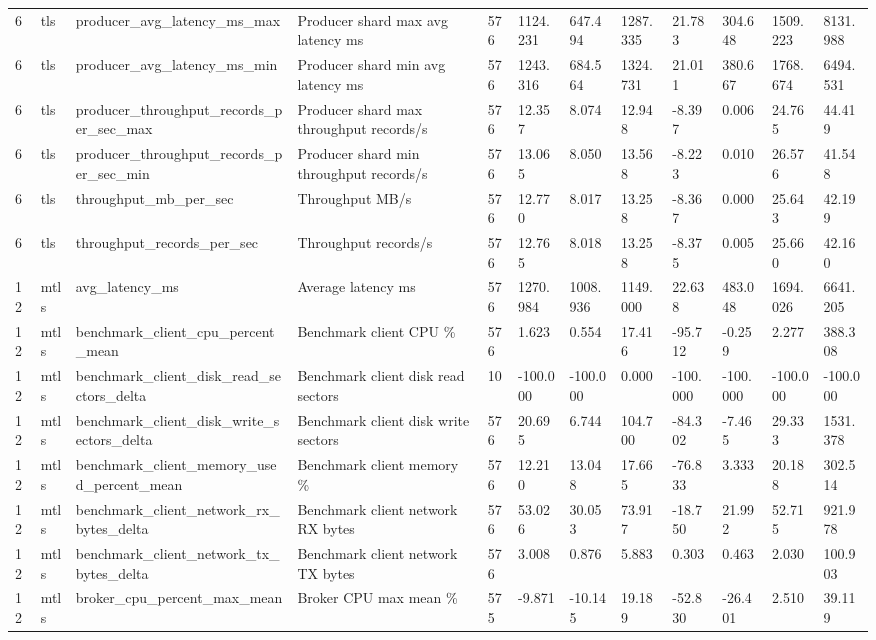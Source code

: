\begin{longtable}{llllllllllll}
6 & tls & producer\_avg\_latency\_ms\_max & Producer shard max avg latency ms & 576 & 1124.231 & 647.494 & 1287.335 & 21.783 & 304.648 & 1509.223 & 8131.988 \\
6 & tls & producer\_avg\_latency\_ms\_min & Producer shard min avg latency ms & 576 & 1243.316 & 684.564 & 1324.731 & 21.011 & 380.667 & 1768.674 & 6494.531 \\
6 & tls & producer\_throughput\_records\_per\_sec\_max & Producer shard max throughput records/s & 576 & 12.357 & 8.074 & 12.948 & -8.397 & 0.006 & 24.765 & 44.419 \\
6 & tls & producer\_throughput\_records\_per\_sec\_min & Producer shard min throughput records/s & 576 & 13.065 & 8.050 & 13.568 & -8.223 & 0.010 & 26.576 & 41.548 \\
6 & tls & throughput\_mb\_per\_sec & Throughput MB/s & 576 & 12.770 & 8.017 & 13.258 & -8.367 & 0.000 & 25.643 & 42.199 \\
6 & tls & throughput\_records\_per\_sec & Throughput records/s & 576 & 12.765 & 8.018 & 13.258 & -8.375 & 0.005 & 25.660 & 42.160 \\
12 & mtls & avg\_latency\_ms & Average latency ms & 576 & 1270.984 & 1008.936 & 1149.000 & 22.638 & 483.048 & 1694.026 & 6641.205 \\
12 & mtls & benchmark\_client\_cpu\_percent\_mean & Benchmark client CPU \% & 576 & 1.623 & 0.554 & 17.416 & -95.712 & -0.259 & 2.277 & 388.308 \\
12 & mtls & benchmark\_client\_disk\_read\_sectors\_delta & Benchmark client disk read sectors & 10 & -100.000 & -100.000 & 0.000 & -100.000 & -100.000 & -100.000 & -100.000 \\
12 & mtls & benchmark\_client\_disk\_write\_sectors\_delta & Benchmark client disk write sectors & 576 & 20.695 & 6.744 & 104.700 & -84.302 & -7.465 & 29.333 & 1531.378 \\
12 & mtls & benchmark\_client\_memory\_used\_percent\_mean & Benchmark client memory \% & 576 & 12.210 & 13.048 & 17.665 & -76.833 & 3.333 & 20.188 & 302.514 \\
12 & mtls & benchmark\_client\_network\_rx\_bytes\_delta & Benchmark client network RX bytes & 576 & 53.026 & 30.053 & 73.917 & -18.750 & 21.992 & 52.715 & 921.978 \\
12 & mtls & benchmark\_client\_network\_tx\_bytes\_delta & Benchmark client network TX bytes & 576 & 3.008 & 0.876 & 5.883 & 0.303 & 0.463 & 2.030 & 100.903 \\
12 & mtls & broker\_cpu\_percent\_max\_mean & Broker CPU max mean \% & 575 & -9.871 & -10.145 & 19.189 & -52.830 & -26.401 & 2.510 & 39.119 \\

\end{longtable}
